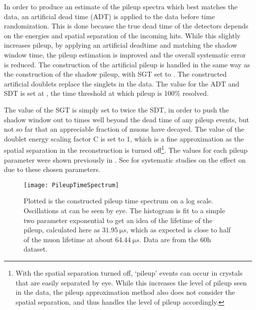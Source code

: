 In order to produce an estimate of the pileup spectra which best matches the data, an artificial dead time (ADT) is applied to the data before time randomization. This is done because the true dead time of the detectors depends on the energies and spatial separation of the incoming hits. While this slightly increases pileup, by applying an artificial deadtime and matching the shadow window time, the pileup estimation is improved and the overall systematic error is reduced. The construction of the artificial pileup is handled in the same way as the construction of the shadow pileup, with SGT set to . The constructed artificial doublets replace the singlets in the data. The value for the ADT and SDT is set at , the time threshold at which pileup is 100\% resolved. 

The value of the SGT is simply set to twice the SDT, in order to push the shadow window out to times well beyond the dead time of any pileup events, but not so far that an appreciable fraction of muons have decayed. The value of the doublet energy scaling factor C is set to 1, which is a fine approximation as the spatial separation in the reconstruction is turned off\footnote{With the spatial separation turned off, `pileup' events can occur in crystals that are easily separated by eye. While this increases the level of pileup seen in the data, the pileup approximation method also does not consider the spatial separation, and thus handles the level of pileup accordingly.}. The values for each pileup parameter were shown previously in . See  for systematic studies on the effect on \wa due to these chosen parameters.

    \begin{figure}[]
        \centering
        \texttt{[image: PileupTimeSpectrum]}
        \caption[Pileup time spectrum above threshold]{Plotted is the constructed pileup time spectrum on a log scale. Oscillations at \wa can be seen by eye. The histogram is fit to a simple two parameter exponential to get an idea of the lifetime of the pileup, calculated here as $\SI{31.95}{\micro s}$, which as expected is close to half of the muon lifetime at about $\SI{64.44}{\micro s}$. Data are from the 60h dataset.}
        \label{fig:PileupTimeSpectrum}
    \end{figure}


